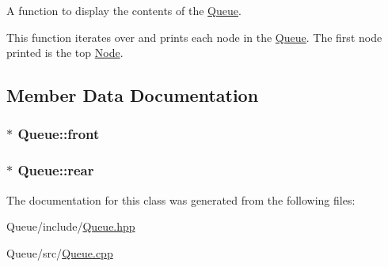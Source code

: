 \-A function to display the contents of the \hyperlink{classQueue}{\-Queue}. 

\-This function iterates over and prints each node in the \hyperlink{classQueue}{\-Queue}. \-The first node printed is the top \hyperlink{classNode}{\-Node}. 

\subsection{\-Member \-Data \-Documentation}
\hypertarget{classQueue_a36ab375d24d41bcc1d598c132700835b}{
\subsubsection[{front}]{$\ast$ {\bf \-Queue\-::front}}}\label{classQueue_a36ab375d24d41bcc1d598c132700835b}
\hypertarget{classQueue_a9e7cf4e1319b62764653fdc67b649dd3}{
\subsubsection[{rear}]{$\ast$ {\bf \-Queue\-::rear}}}\label{classQueue_a9e7cf4e1319b62764653fdc67b649dd3}


\-The documentation for this class was generated from the following files\-:\begin{DoxyCompactItemize}
\item 
\-Queue/include/\hyperlink{Queue_8hpp}{\-Queue.\-hpp}\item 
\-Queue/src/\hyperlink{Queue_8cpp}{\-Queue.\-cpp}\end{DoxyCompactItemize}
